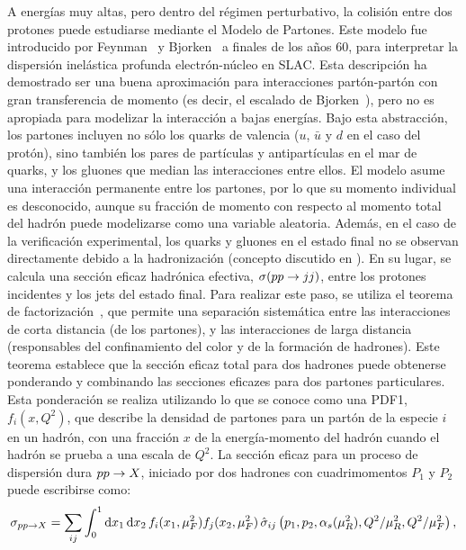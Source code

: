 A energías muy altas, pero dentro del régimen perturbativo, la colisión entre dos protones puede estudiarse mediante el Modelo de Partones. Este modelo fue introducido por Feynman~\cite{Feynman-1969} y Bjorken~\cite{Bjorken-1969_1} a finales de los años 60, para interpretar la dispersión inelástica profunda electrón-núcleo en SLAC. Esta descripción ha demostrado ser una buena aproximación para interacciones partón-partón con gran transferencia de momento (es decir, el escalado de Bjorken~\cite{Bjorken-1969_2}), pero no es apropiada para modelizar la interacción a bajas energías.
Bajo esta abstracción, los partones incluyen no sólo los quarks de valencia (\(u\), \(\bar{u}\) y \(d\) en el caso del protón), sino también los pares de partículas y antipartículas en el mar de quarks, y los gluones que median las interacciones entre ellos. El modelo asume una interacción permanente entre los partones, por lo que su momento individual es desconocido, aunque su fracción de momento con respecto al momento total del hadrón puede modelizarse como una variable aleatoria.
Además, en el caso de la verificación experimental, los quarks y gluones en el estado final no se observan directamente debido a la hadronización (concepto discutido en \Sect{\ref{subsec:theory:mc_simulation:hadronisation}}). En su lugar, se calcula una sección eficaz hadrónica efectiva, \(\sigma(pp\rightarrow jj)\), entre los protones incidentes y los jets del estado final. Para realizar este paso, se utiliza el teorema de factorización~\cite{Ellis_Georgi_Politzer_Ross-1978,Feynman-1969,Collins_Soper_Sterman-book,Collins_Soper-1987}, que permite una separación sistemática entre las interacciones de corta distancia (de los partones), y las interacciones de larga distancia (responsables del confinamiento del color y de la formación de hadrones). Este teorema establece que la sección eficaz total para dos hadrones puede obtenerse ponderando y combinando las secciones eficazes para dos partones particulares. Esta ponderación se realiza utilizando lo que se conoce como una \ac{PDF1}, \(f_i(x,Q^2)\), que describe la densidad de partones para un part\'on de la especie \(i\) en un hadrón, con una fracción \(x\) de la energía-momento del hadrón cuando el hadrón se prueba a una escala de \(Q^2\). La sección eficaz para un proceso de dispersión dura \(pp \rightarrow X\), iniciado por dos hadrones con cuadrimomentos \(P_1\) y \(P_2\) puede escribirse como:
\begin{equation}
    \label{eq:theory:sm:hadron_interactions:xs}
    \sigma_{pp\rightarrow X} = \sum_{ij} \int_0^1 \dd{x_1} \dd{x_2} f_i(x_1, \mu_F^2) f_j(x_2, \mu_F^2) \, \hat{\sigma}_{ij}\left(p_1, p_2, \alpha_s(\mu_R^2), Q^2/\mu_R^2, Q^2/\mu_F^2 \right),
\end{equation}
